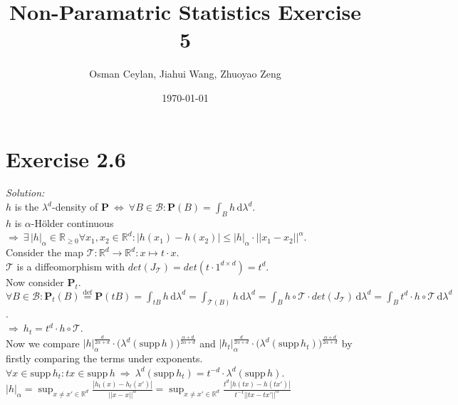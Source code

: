 \documentclass{article}
\title{Non-Paramatric Statistics Exercise 5}
\author{Osman Ceylan, Jiahui Wang, Zhuoyao Zeng}
\date{\today}
\begin{document}
\maketitle

\section*{Exercise 2.6} \vspace*{-1em}
\textit{Solution:} \\
$h$ is the $\lambda ^d$-density of $\mathbf{P} \ \Leftrightarrow \ \forall
 B \in \mathcal{B}: \mathbf{P}(B) = \displaystyle{ \int_B h \, \text{d}\lambda ^d  }$.\\
$h$ is $\alpha$-Hölder continuous $\Rightarrow \ \exists\, |h|_{\alpha} \in \mathbb{R}_{\geq 0} \forall x_1, x_2 \in \mathbb{R}^d: |h(x_1)-h(x_2)|\leq |h|_{\alpha}\cdot ||x_1 - x_2||^{\alpha}$.\\
Consider the map $\mathcal{T}: \mathbb{R}^d \rightarrow \mathbb{R}^d : x \mapsto t\cdot x$. \\
$\mathcal{T}$ is a diffeomorphism with $det(J_{\mathcal{T}}) = det( t \cdot 1^{d \times d} ) = t^d$. \\
Now consider $\mathbf{P}_t$.\\
$\forall B \in \mathcal{B}: \mathbf{P}_t(B) \overset{\text{def}}{=} \mathbf{P}(tB) = \displaystyle{ \int_{tB} h \, \text{d}\lambda ^d = \int_{\mathcal{T}(B)} h \, \text{d}\lambda ^d = \int_B h \circ \mathcal{T} \cdot det(J_{\mathcal{T}})  \, \text{d}\lambda ^d  =  \int_B t^d \cdot h \circ \mathcal{T}   \, \text{d}\lambda ^d    } $.\\
$\Rightarrow \ h_t = t^d \cdot h \circ \mathcal{T}$.\\
Now we compare $|h|_{\alpha}^{ \frac{d}{2\alpha + d} } \cdot \big( \lambda ^d (\text{supp}\,h)  \big)^{ \frac{\alpha + d}{2 \alpha + d} } $ and $|h_t|_{\alpha}^{ \frac{d}{2\alpha + d} } \cdot \big( \lambda ^d (\text{supp}\,h_t)  \big)^{ \frac{\alpha + d}{2 \alpha + d} } $ by firstly comparing the terms under exponents. \\
$\forall x \in \text{supp}\,h_t : tx \in \text{supp}\,h \ \Rightarrow \ \lambda ^d (\text{supp}\,h_t) = t^{-d} \cdot \lambda ^d (\text{supp}\, h)$. \vspace*{0.8em} \\
$|h|_{\alpha} = \sup_{x \neq x' \in \mathbb{R}^d} \frac{|h_t(x)-h_t(x')|}{||x-x||^{\alpha}} =\sup_{x \neq x' \in \mathbb{R}^d} \frac{  t^d \, |h(tx)-h(tx')|}{  t^{-1} || tx-tx' || ^{\alpha}} $\vspace*{0.5em} \\
\end{document}
